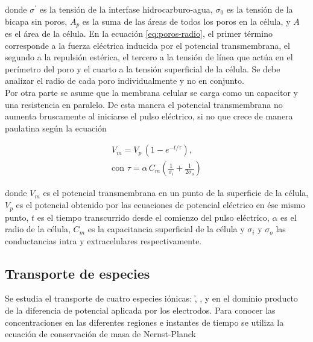 donde $\sigma^\prime$ es la tensión de la interfase hidrocarburo-agua, $\sigma_0$ es la tensión de la bicapa sin poros, $A_p$ es la suma de las áreas de todos los poros en la célula, y $A$ es el área de la célula. En la ecuación \ref{eq:poros-radio}, el primer término corresponde a la fuerza eléctrica inducida por el potencial transmembrana, el segundo a la repulsión estérica, el tercero a la tensión de línea que actúa en el perímetro del poro y el cuarto a la tensión superficial de la célula. Se debe analizar el radio de cada poro individualmente y no en conjunto.\\

Por otra parte se asume que la membrana celular se carga como un capacitor y una resistencia en paralelo. De esta manera el potencial transmembrana no aumenta bruscamente al iniciarse el pulso eléctrico, si no que crece de manera paulatina según la ecuación \cite{hibino}

\begin{equation} \label{eq:capacit} \begin{split}
	V_m = V_p\, (1 - e^{-t/\tau}) , \\ \textrm{con } \tau = \alpha\, C_m \left( \frac{1}{\sigma_i} + \frac{1}{2 \sigma_o} \right)
\end{split} \end{equation}

donde $V_m$ es el potencial transmembrana en un punto de la superficie de la célula, $V_p$ es el potencial obtenido por las ecuaciones de potencial eléctrico en ése mismo punto, $t$ es el tiempo transcurrido desde el comienzo del pulso eléctrico, $\alpha$ es el radio de la célula, $C_m$ es la capacitancia superficial de la célula y $\sigma_i$ y $\sigma_o$ las conductancias intra y extracelulares respectivamente.

\subsection*{Transporte de especies}
Se estudia el transporte de cuatro especies iónicas: \h, \oh, \na y \cl en el dominio producto de la diferencia de potencial aplicada por los electrodos. Para conocer las concentraciones en las diferentes regiones e instantes de tiempo se utiliza la ecuación de conservación de masa de Nernst-Planck \cite{c6-fodava}


